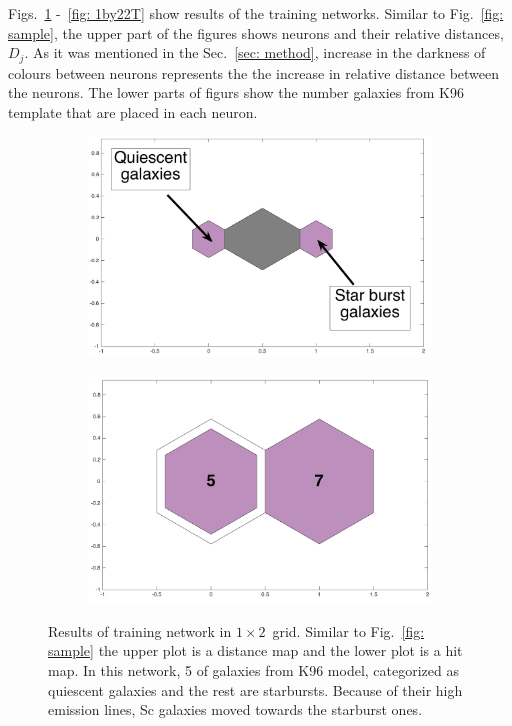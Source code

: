             Figs.~\ref{fig: 1by2T} -~\ref{fig: 1by22T} show results of the training networks.
            Similar to Fig.~\ref{fig: sample}, the upper part of the figures shows neurons and their relative distances, $D_j$.
            As it was mentioned in the Sec.~\ref{sec: method}, increase in the darkness of colours between neurons represents the the increase in relative distance between the neurons.
            The lower parts of figurs show the number galaxies from K96 template that are placed in each neuron. 
            \begin{figure}
                \begin{subfigure}[b]{0.5\textwidth}
                    \centering
                    \includegraphics[width=\textwidth]{images0.01/1d/dist_1_by_2.png}
                \end{subfigure}
                \hfill
                \begin{subfigure}[b]{0.5\textwidth}
                     \includegraphics[width=\textwidth]{images0.01/1d/hit_t_1_by_2.png}
                \end{subfigure}
                \caption{Results of training network in $1\times2$~grid. Similar to Fig.~\ref{fig: sample} the upper plot is a distance map and the lower plot is a hit map. In this network, 5 of galaxies from K96 model, categorized as quiescent galaxies and the rest are starbursts. Because of their high emission lines, Sc galaxies moved towards the starburst ones.}
                 \label{fig: 1by2T}
            \end{figure}
        
